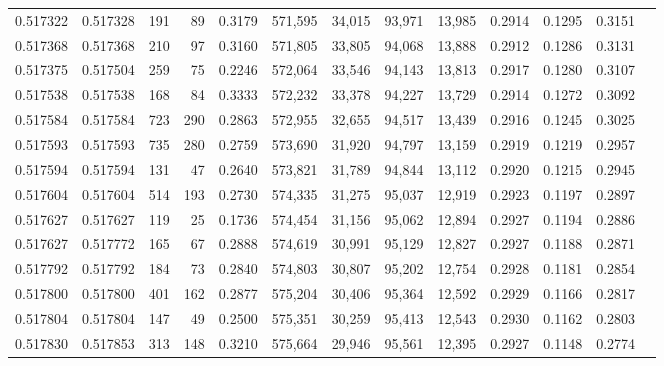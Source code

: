 \begin{tabular}{rrrrrrrrrrrrr}
0.517322 & 0.517328 &   191 &    89 &                                     0.3179 & 571,595 &  34,015 &  93,971 &  13,985 & 0.2914 & 0.1295 & 0.3151 \\
0.517368 & 0.517368 &   210 &    97 &                                     0.3160 & 571,805 &  33,805 &  94,068 &  13,888 & 0.2912 & 0.1286 & 0.3131 \\
0.517375 & 0.517504 &   259 &    75 &                                     0.2246 & 572,064 &  33,546 &  94,143 &  13,813 & 0.2917 & 0.1280 & 0.3107 \\
0.517538 & 0.517538 &   168 &    84 &                                     0.3333 & 572,232 &  33,378 &  94,227 &  13,729 & 0.2914 & 0.1272 & 0.3092 \\
0.517584 & 0.517584 &   723 &   290 &                                     0.2863 & 572,955 &  32,655 &  94,517 &  13,439 & 0.2916 & 0.1245 & 0.3025 \\
0.517593 & 0.517593 &   735 &   280 &                                     0.2759 & 573,690 &  31,920 &  94,797 &  13,159 & 0.2919 & 0.1219 & 0.2957 \\
0.517594 & 0.517594 &   131 &    47 &                                     0.2640 & 573,821 &  31,789 &  94,844 &  13,112 & 0.2920 & 0.1215 & 0.2945 \\
0.517604 & 0.517604 &   514 &   193 &                                     0.2730 & 574,335 &  31,275 &  95,037 &  12,919 & 0.2923 & 0.1197 & 0.2897 \\
0.517627 & 0.517627 &   119 &    25 &                                     0.1736 & 574,454 &  31,156 &  95,062 &  12,894 & 0.2927 & 0.1194 & 0.2886 \\
0.517627 & 0.517772 &   165 &    67 &                                     0.2888 & 574,619 &  30,991 &  95,129 &  12,827 & 0.2927 & 0.1188 & 0.2871 \\
0.517792 & 0.517792 &   184 &    73 &                                     0.2840 & 574,803 &  30,807 &  95,202 &  12,754 & 0.2928 & 0.1181 & 0.2854 \\
0.517800 & 0.517800 &   401 &   162 &                                     0.2877 & 575,204 &  30,406 &  95,364 &  12,592 & 0.2929 & 0.1166 & 0.2817 \\
0.517804 & 0.517804 &   147 &    49 &                                     0.2500 & 575,351 &  30,259 &  95,413 &  12,543 & 0.2930 & 0.1162 & 0.2803 \\
0.517830 & 0.517853 &   313 &   148 &                                     0.3210 & 575,664 &  29,946 &  95,561 &  12,395 & 0.2927 & 0.1148 & 0.2774 \\

\end{tabular}
